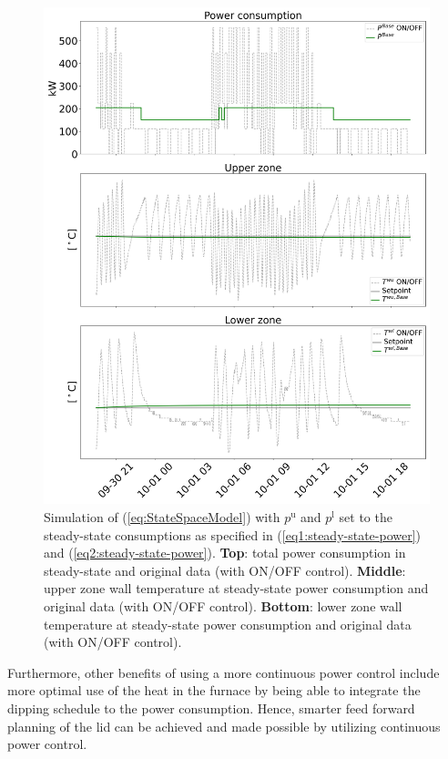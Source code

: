 \documentclass[lettersize,journal]{IEEEtran}
\begin{document}
\begin{figure}[t]
    \centering
    \includegraphics[width=\columnwidth]{figures/4thOrderModelVisualizationSteadyState.png}
    \caption{Simulation of (\ref{eq:StateSpaceModel}) with $p^{\text{u}}$ and $p^{\text{l}}$ set to the steady-state consumptions as specified in (\ref{eq1:steady-state-power}) and (\ref{eq2:steady-state-power}). \textbf{Top}: total power consumption in steady-state and original data (with ON/OFF control). \textbf{Middle}: upper zone wall temperature at steady-state power consumption and original data (with ON/OFF control). \textbf{Bottom}: lower zone wall temperature at steady-state power consumption and original data (with ON/OFF control).}
    \label{fig:4thOrderModelVisualizationSteadyState}
\end{figure}

Furthermore, other benefits of using a more continuous power control include more optimal use of the heat in the furnace by being able to integrate the dipping schedule to the power consumption. Hence, smarter feed forward planning of the lid can be achieved and made possible by utilizing continuous power control.
\end{document}
